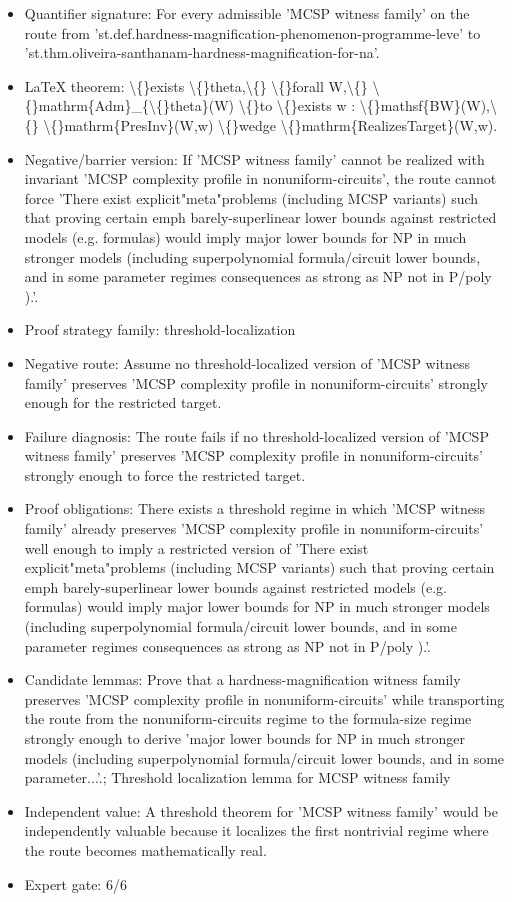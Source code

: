 \documentclass[11pt]{article}
\begin{document}
\begin{itemize}
\item Quantifier signature: For every admissible 'MCSP witness family' on the route from 'st.def.hardness-magnification-phenomenon-programme-leve' to 'st.thm.oliveira-santhanam-hardness-magnification-for-na'.
\item LaTeX theorem: \textbackslash\{\}exists \textbackslash\{\}theta,\textbackslash\{\} \textbackslash\{\}forall W,\textbackslash\{\} \textbackslash\{\}mathrm\{Adm\}\_\{\textbackslash\{\}theta\}(W) \textbackslash\{\}to \textbackslash\{\}exists w : \textbackslash\{\}mathsf\{BW\}(W),\textbackslash\{\} \textbackslash\{\}mathrm\{PresInv\}(W,w) \textbackslash\{\}wedge \textbackslash\{\}mathrm\{RealizesTarget\}(W,w).
\item Negative/barrier version: If 'MCSP witness family' cannot be realized with invariant 'MCSP complexity profile in nonuniform-circuits', the route cannot force 'There exist explicit"meta"problems (including MCSP variants) such that proving certain emph barely-superlinear lower bounds against restricted models (e.g. formulas) would imply major lower bounds for NP in much stronger models (including superpolynomial formula/circuit lower bounds, and in some parameter regimes consequences as strong as NP not in P/poly ).'.
\item Proof strategy family: threshold-localization
\item Negative route: Assume no threshold-localized version of 'MCSP witness family' preserves 'MCSP complexity profile in nonuniform-circuits' strongly enough for the restricted target.
\item Failure diagnosis: The route fails if no threshold-localized version of 'MCSP witness family' preserves 'MCSP complexity profile in nonuniform-circuits' strongly enough to force the restricted target.
\item Proof obligations: There exists a threshold regime in which 'MCSP witness family' already preserves 'MCSP complexity profile in nonuniform-circuits' well enough to imply a restricted version of 'There exist explicit"meta"problems (including MCSP variants) such that proving certain emph barely-superlinear lower bounds against restricted models (e.g. formulas) would imply major lower bounds for NP in much stronger models (including superpolynomial formula/circuit lower bounds, and in some parameter regimes consequences as strong as NP not in P/poly ).'.
\item Candidate lemmas: Prove that a hardness-magnification witness family preserves 'MCSP complexity profile in nonuniform-circuits' while transporting the route from the nonuniform-circuits regime to the formula-size regime strongly enough to derive 'major lower bounds for NP in much stronger models (including superpolynomial formula/circuit lower bounds, and in some parameter...'.; Threshold localization lemma for MCSP witness family
\item Independent value: A threshold theorem for 'MCSP witness family' would be independently valuable because it localizes the first nontrivial regime where the route becomes mathematically real.
\item Expert gate: 6/6
\end{itemize}
\end{document}
